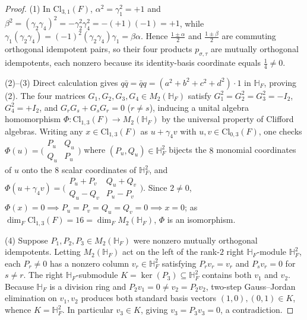 \documentclass[11pt]{article}
\theoremstyle{definition}
\newcommand{\Cl}{\mathrm{Cl}}
\begin{document}
\begin{proof}
(1) In $\Cl_{3,1}(F)$, $\alpha^2 = \gamma_1^2 = +1$ and $\beta^2 = (\gamma_2 \gamma_4)^2 = -\gamma_2^2 \gamma_4^2 = -(+1)(-1) = +1$, while $\gamma_1(\gamma_2 \gamma_4) = (-1)^2 (\gamma_2 \gamma_4)\gamma_1 = \beta\alpha$. Hence $\frac{1 \pm \alpha}{2}$ and $\frac{1 \pm \beta}{2}$ are commuting orthogonal idempotent pairs, so their four products $p_{\sigma,\tau}$ are mutually orthogonal idempotents, each nonzero because its identity-basis coordinate equals $\frac{1}{4} \neq 0$.

(2)--(3) Direct calculation gives $q\bar{q} = \bar{q}q = (a^2 + b^2 + c^2 + d^2)\cdot 1$ in $\mathbb{H}_F$, proving (2). The four matrices $G_1, G_2, G_3, G_4 \in M_2(\mathbb{H}_F)$ satisfy $G_1^2 = G_2^2 = G_3^2 = -I_2$, $G_4^2 = +I_2$, and $G_r G_s + G_s G_r = 0$ ($r \neq s$), inducing a unital algebra homomorphism $\Phi : \Cl_{1,3}(F) \to M_2(\mathbb{H}_F)$ by the universal property of Clifford algebras. Writing any $x \in \Cl_{1,3}(F)$ as $u + \gamma_4 v$ with $u, v \in \Cl_{0,3}(F)$, one checks $\Phi(u) = \bigl(\begin{smallmatrix}P_u & Q_u\\ Q_u & P_u\end{smallmatrix}\bigr)$ where $(P_u, Q_u) \in \mathbb{H}_F^2$ bijects the $8$ monomial coordinates of $u$ onto the $8$ scalar coordinates of $\mathbb{H}_F^2$, and $\Phi(u + \gamma_4 v) = \bigl(\begin{smallmatrix}P_u + P_v & Q_u + Q_v\\ Q_u - Q_v & P_u - P_v\end{smallmatrix}\bigr)$. Since $2 \neq 0$, $\Phi(x) = 0 \implies P_u = P_v = Q_u = Q_v = 0 \implies x = 0$; as $\dim_F \Cl_{1,3}(F) = 16 = \dim_F M_2(\mathbb{H}_F)$, $\Phi$ is an isomorphism.

(4) Suppose $P_1, P_2, P_3 \in M_2(\mathbb{H}_F)$ were nonzero mutually orthogonal idempotents. Letting $M_2(\mathbb{H}_F)$ act on the left of the rank-$2$ right $\mathbb{H}_F$-module $\mathbb{H}_F^2$, each $P_r \neq 0$ has a nonzero column $v_r \in \mathbb{H}_F^2$ satisfying $P_r v_r = v_r$ and $P_s v_r = 0$ for $s \neq r$. The right $\mathbb{H}_F$-submodule $K = \ker(P_3) \subseteq \mathbb{H}_F^2$ contains both $v_1$ and $v_2$. Because $\mathbb{H}_F$ is a division ring and $P_2 v_1 = 0 \neq v_2 = P_2 v_2$, two-step Gauss--Jordan elimination on $v_1, v_2$ produces both standard basis vectors $(1, 0), (0, 1) \in K$, whence $K = \mathbb{H}_F^2$. In particular $v_3 \in K$, giving $v_3 = P_3 v_3 = 0$, a contradiction.
\end{proof}
\end{document}
